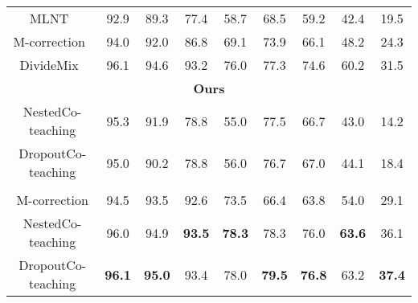 \documentclass[journal]{IEEEtran}
\begin{document}
\begin{table*}[t]
\begin{minipage}{0.7\textwidth}
{{\begin{tabular}{ccccccccc}
            \\
            \multicolumn{1}{c|}{MLNT~\cite{li2019learning,li2020dividemix}}  
            & 92.9 & 89.3 & 77.4 & \multicolumn{1}{c|}{58.7} & 68.5 & 59.2 & 42.4 & 19.5     
            \\
            \multicolumn{1}{c|}{M-correction~\cite{arazo2019unsupervised}}        
            & 94.0 & 92.0 & 86.8 & \multicolumn{1}{c|}{69.1} & 73.9 & 66.1 & 48.2 & 24.3       
            \\
            \multicolumn{1}{c|}{DivideMix~\cite{li2020dividemix}}       & 96.1 & 94.6 & 93.2 & \multicolumn{1}{c|}{76.0} & 77.3 & 74.6 & 60.2 & 31.5      
            \\ \hline
            \multicolumn{9}{c}{\bf Ours}                                
            \\
            \multicolumn{1}{c|}{NestedCo-teaching}              
            & 95.3 & 91.9 & 78.8 & \multicolumn{1}{c|}{55.0} & 77.5 & 66.7 & 43.0 & 14.2
            \\
            \multicolumn{1}{c|}{DropoutCo-teaching}              
            & 95.0 & 90.2 & 78.8 & \multicolumn{1}{c|}{56.0} & 76.7 & 67.0 & 44.1 & 18.4
            \\ \hdashline
            \multicolumn{9}{c}{\bf Pre-Cleaning with DivideMix}      
            \\
            \multicolumn{1}{c|}{M-correction} 
            & 94.5 & 93.5 & 92.6 & \multicolumn{1}{c|}{73.5} & 66.4 & 63.8 & 54.0 & 29.1
            \\
            \multicolumn{1}{c|}{NestedCo-teaching}  & 96.0 & 94.9 & \bf 93.5 & \multicolumn{1}{c|}{\bf 78.3} & 78.3 & 76.0 & \bf 63.6 & 36.1
            \\
            \multicolumn{1}{c|}{DropoutCo-teaching }
            & \bf 96.1 & \bf 95.0 & 93.4 & \multicolumn{1}{c|}{78.0} & \bf 79.5 & \bf 76.8 & 63.2 & \bf 37.4
            \\ 
            \hline\hline
        \end{tabular}}}
    \end{minipage}\hfill
    \begin{minipage}{0.3\textwidth}
        \centering
\end{minipage}
\end{table*}
\end{document}
